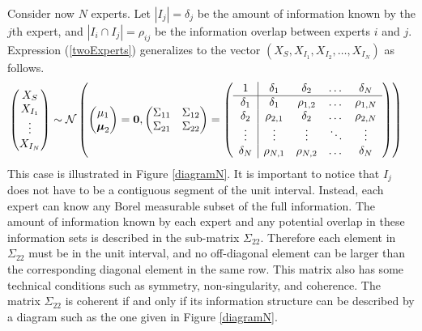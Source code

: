 \documentclass[11pt,twoside]{article}
\theoremstyle{definition}
\theoremstyle{definition}
\begin{document}
Consider now $N$ experts. Let $|I_j| = \delta_j$ be the amount of information known by the $j$th expert, and $|I_i \cap I_j| = \rho_{ij}$ be the information overlap between experts $i$ and $j$. Expression (\ref{twoExperts}) generalizes to the vector $(X_{S}, X_{I_1}, X_{I_2}, \dots, X_{I_N})$ as follows.
\begin{align}
\left(\begin{matrix} X_S \\ X_{I_1}\\ \vdots \\ X_{I_N} \end{matrix}\right) &\sim \mathcal{N}\left( \left(\begin{matrix} 
\mu_1 \\ \boldsymbol{\mu}_2
 \end{matrix}\right) =
 \boldsymbol{0}, \left(\begin{matrix} 
\Sigma_{11} & \Sigma_{12}\\
\Sigma_{21} & \Sigma_{22}\\
 \end{matrix}\right) 
 =
 \left(\begin{array}{c | c c cc }
1 & \delta_1 & \delta_2 & \dots & \delta_N  \\ \hline
\delta_1 & \delta_1 &\rho_{1,2} & \dots & \rho_{1,N}   \\ 
\delta_2 & \rho_{2,1} & \delta_2 & \dots & \rho_{2,N}  \\ 
\vdots & \vdots & \vdots & \ddots & \vdots  \\ 
\delta_N & \rho_{N,1} & \rho_{N,2} & \dots & \delta_N\\ 
 \end{array}\right)\right)  \label{NExperts}
\end{align}
This case is illustrated in Figure \ref{diagramN}. It is important to notice that $I_j$ does not have to be a contiguous segment of the unit interval. Instead, each expert can know any Borel measurable subset of the full information. The amount of information known by each expert and any potential overlap in these information sets is described in the sub-matrix $\Sigma_{22}$. Therefore each element in $\Sigma_{22}$ must be in the unit interval, and no off-diagonal element can be larger than the corresponding diagonal element in the same row. This matrix also has some technical conditions such as symmetry, non-singularity, and coherence. The matrix $\Sigma_{22}$ is coherent if and only if its information structure can be described by a diagram such as the one given in Figure \ref{diagramN}. 
\end{document}

